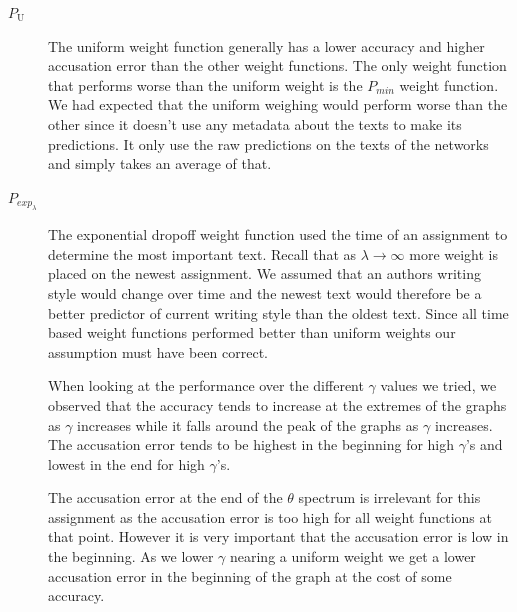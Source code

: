 \begin{description}

    \item[$P_\mathrm{U}$]

        The uniform weight function generally has a lower accuracy and higher
        accusation error than the other weight functions. The only weight
        function that performs worse than the uniform weight is the $P_{min}$
        weight function. We had expected that the uniform weighing would perform
        worse than the other since it doesn't use any metadata about the texts
        to make its predictions. It only use the raw predictions on the texts of
        the networks and simply takes an average of that.

    \item[$P_{exp_\lambda}$]

        The exponential dropoff weight function used the time of an assignment
        to determine the most important text. Recall that as $\lambda
        \rightarrow \infty$ more weight is placed on the newest assignment. We
        assumed that an authors writing style would change over time and the
        newest text would therefore be a better predictor of current writing
        style than the oldest text. Since all time based weight functions
        performed better than uniform weights our assumption must have been
        correct.

        When looking at the performance over the different $\gamma$ values we
        tried, we observed that the accuracy tends to increase at the extremes
        of the graphs as $\gamma$ increases while it falls around the peak of
        the graphs as $\gamma$ increases. The accusation error tends to be
        highest in the beginning for high $\gamma$'s and lowest in the end for
        high $\gamma$'s.

        The accusation error at the end of the $\theta$ spectrum is irrelevant
        for this assignment as the accusation error is too high for all weight
        functions at that point. However it is very important that the
        accusation error is low in the beginning. As we lower $\gamma$ nearing a
        uniform weight we get a lower accusation error in the beginning of the
        graph at the cost of some accuracy.


\end{description}
